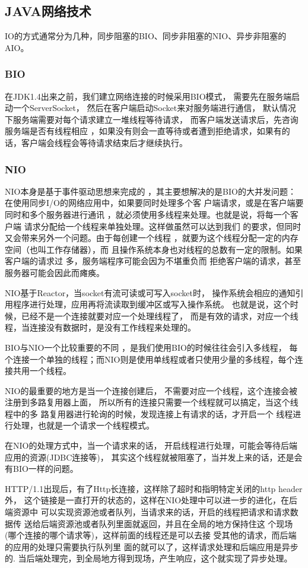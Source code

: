 \subsection{JAVA网络技术}
IO的方式通常分为几种，同步阻塞的BIO、同步非阻塞的NIO、异步非阻塞的AIO。
\subsubsection{BIO}
在JDK1.4出来之前，我们建立网络连接的时候采用BIO模式，
需要先在服务端启动一个ServerSocket，
然后在客户端启动Socket来对服务端进行通信，
默认情况下服务端需要对每个请求建立一堆线程等待请求，
而客户端发送请求后，先咨询服务端是否有线程相应
，如果没有则会一直等待或者遭到拒绝请求，如果有的话，客户端会线程会等待请求结束后才继续执行。
\subsubsection{NIO}
NIO本身是基于事件驱动思想来完成的
，其主要想解决的是BIO的大并发问题：
 在使用同步I/O的网络应用中，如果要同时处理多个客
 户端请求，或是在客户端要同时和多个服务器进行通讯
 ，就必须使用多线程来处理。也就是说，将每一个客户端
 请求分配给一个线程来单独处理。这样做虽然可以达到我们
 的要求，但同时又会带来另外一个问题。由于每创建一个线程
 ，就要为这个线程分配一定的内存空间（也叫工作存储器），而
 且操作系统本身也对线程的总数有一定的限制。如果客户端的请求过
 多，服务端程序可能会因为不堪重负而
 拒绝客户端的请求，甚至服务器可能会因此而瘫痪。
 
NIO基于Reactor，当socket有流可读或可写入socket时，
操作系统会相应的通知引用程序进行处理，应用再将流读取到缓冲区或写入操作系统。
 也就是说，这个时候，已经不是一个连接就要对应一个处理线程了，
 而是有效的请求，对应一个线程，当连接没有数据时，是没有工作线程来处理的。

BIO与NIO一个比较重要的不同
，是我们使用BIO的时候往往会引入多线程，
每个连接一个单独的线程；而NIO则是使用单线程或者只使用少量的多线程，每个连接共用一个线程。

NIO的最重要的地方是当一个连接创建后，
不需要对应一个线程，这个连接会被注册到多路复用器上面，
所以所有的连接只需要一个线程就可以搞定，当这个线程中的多
路复用器进行轮询的时候，发现连接上有请求的话，才开启一个
线程进行处理，也就是一个请求一个线程模式。

在NIO的处理方式中，当一个请求来的话，
开启线程进行处理，可能会等待后端应用的资源(JDBC连接等)，
其实这个线程就被阻塞了，当并发上来的话，还是会有BIO一样的问题。

HTTP/1.1出现后，有了Http长连接，这样除了超时和指明特定关闭的http header外，
这个链接是一直打开的状态的，这样在NIO处理中可以进一步的进化，在后端资源中
可以实现资源池或者队列，当请求来的话，开启的线程把请求和请求数据传
送给后端资源池或者队列里面就返回，并且在全局的地方保持住这
个现场(哪个连接的哪个请求等)，这样前面的线程还是可以去接
受其他的请求，而后端的应用的处理只需要执行队列里
面的就可以了，这样请求处理和后端应用是异步的.
当后端处理完，到全局地方得到现场，产生响应，这个就实现了异步处理。

